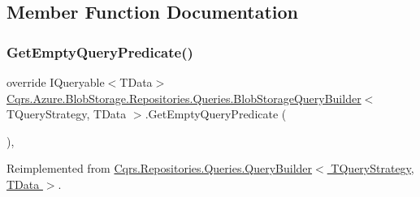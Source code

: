 \subsection{Member Function Documentation}
\mbox{\label{classCqrs_1_1Azure_1_1BlobStorage_1_1Repositories_1_1Queries_1_1BlobStorageQueryBuilder_a5987844de032c5473714dafcee7f4ae1}} 
\subsubsection{\texorpdfstring{Get\+Empty\+Query\+Predicate()}{GetEmptyQueryPredicate()}}
{\footnotesize\ttfamily override I\+Queryable$<$T\+Data$>$ \hyperlink{classCqrs_1_1Azure_1_1BlobStorage_1_1Repositories_1_1Queries_1_1BlobStorageQueryBuilder}{Cqrs.\+Azure.\+Blob\+Storage.\+Repositories.\+Queries.\+Blob\+Storage\+Query\+Builder}$<$ T\+Query\+Strategy, T\+Data $>$.Get\+Empty\+Query\+Predicate (\begin{DoxyParamCaption}{ }\end{DoxyParamCaption})\hspace{0.3cm}{\ttfamily [protected]}, {\ttfamily [virtual]}}



Reimplemented from \hyperlink{classCqrs_1_1Repositories_1_1Queries_1_1QueryBuilder_a7dc8f0da3bb4ef54b8cbdda6c50ee0a1}{Cqrs.\+Repositories.\+Queries.\+Query\+Builder$<$ T\+Query\+Strategy, T\+Data $>$}.

